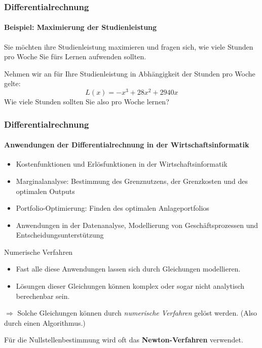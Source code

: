 \documentclass{beamer}
\begin{document}
\begin{frame}
  \frametitle{Differentialrechnung}
  \framesubtitle{Beispiel: Maximierung der Studienleistung}
    Sie möchten ihre Studienleistung maximieren und fragen sich, wie viele Stunden pro Woche Sie 
    fürs Lernen aufwenden sollten. 

    Nehmen wir an für Ihre Studienleistung in Abhängigkeit der Stunden pro Woche gelte:
    $$L(x)=-x^3+28x^2+2940x$$
  Wie viele Stunden sollten Sie also pro Woche lernen?

  \begin{flushright}
  \end{flushright}
\end{frame}



\begin{frame}
  \frametitle{Differentialrechnung}
  \framesubtitle{Anwendungen der Differentialrechnung in der Wirtschaftsinformatik}

  \begin{itemize}
    \item Kostenfunktionen und Erlösfunktionen in der Wirtschaftsinformatik
    \item Marginalanalyse: Bestimmung des Grenznutzens, der Grenzkosten und des optimalen Outputs
    \item Portfolio-Optimierung: Finden des optimalen Anlageportfolios 
    \item Anwendungen in der Datenanalyse, Modellierung von Geschäftsprozessen und Entscheidungsunterstützung
  \end{itemize}
\end{frame}


\begin{frame}{Numerische Verfahren}
    \begin{itemize}
    \item Fast alle diese Anwendungen lassen sich durch Gleichungen modellieren.
    \item Lösungen dieser Gleichungen können komplex oder sogar nicht analytisch berechenbar sein.
  \end{itemize}

  $\Longrightarrow$ Solche Gleichungen können durch \textit{numerische Verfahren} gelöst werden. (Also durch einen Algorithmus.)

  \vspace*{1em}

  Für die Nullstellenbestimmung wird oft das \textbf{Newton-Verfahren} verwendet.
\end{frame}
\end{document}
